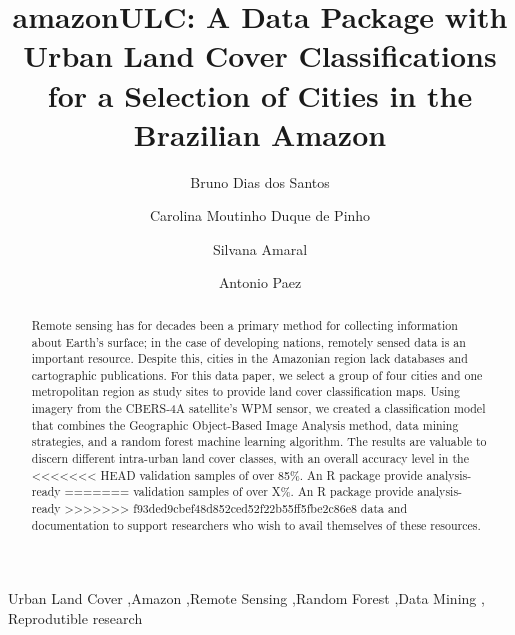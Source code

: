 \documentclass[preprint, 3p,
authoryear]{elsarticle} %
\begin{document}
\begin{frontmatter}

  \title{amazonULC: A Data Package with Urban Land Cover Classifications
for a Selection of Cities in the Brazilian Amazon}
    \author[National Institute for Space Research (INPE)]{Bruno Dias dos
Santos%
  }
    \author[Federal University of ABC (UFABC)]{Carolina Moutinho Duque
de Pinho%
  }
    \author[National Institute for Space Research (INPE)]{Silvana
Amaral%
  }
    \author[McMaster University]{Antonio Paez%
  }
  
  \begin{abstract}
  Remote sensing has for decades been a primary method for collecting
  information about Earth's surface; in the case of developing nations,
  remotely sensed data is an important resource. Despite this, cities in
  the Amazonian region lack databases and cartographic publications. For
  this data paper, we select a group of four cities and one metropolitan
  region as study sites to provide land cover classification maps. Using
  imagery from the CBERS-4A satellite's WPM sensor, we created a
  classification model that combines the Geographic Object-Based Image
  Analysis method, data mining strategies, and a random forest machine
  learning algorithm. The results are valuable to discern different
  intra-urban land cover classes, with an overall accuracy level in the
<<<<<<< HEAD
  validation samples of over 85\%. An R package provide analysis-ready
=======
  validation samples of over X\%. An R package provide analysis-ready
>>>>>>> f93ded9cbef48d852ced52f22b55ff5fbe2c86e8
  data and documentation to support researchers who wish to avail
  themselves of these resources.
  \end{abstract}
    \begin{keyword}
    Urban Land Cover \sep Amazon \sep Remote Sensing \sep Random
Forest \sep Data Mining \sep 
    Reprodutible research
  \end{keyword}
  
 \end{frontmatter}
\end{document}
